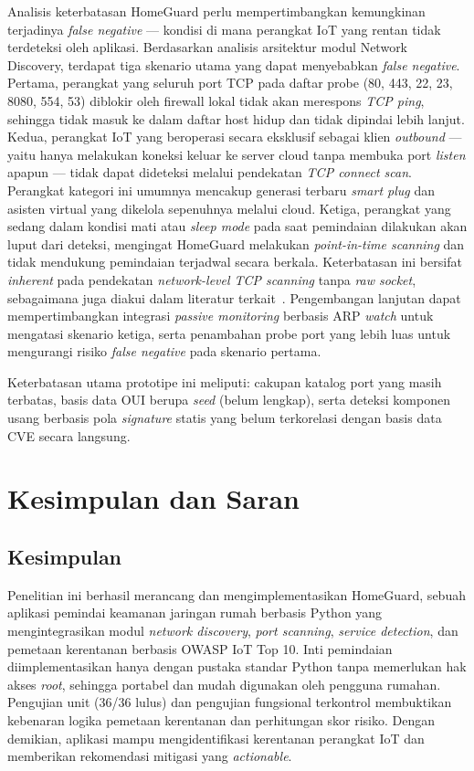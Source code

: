 Analisis keterbatasan HomeGuard perlu mempertimbangkan kemungkinan terjadinya
\textit{false negative} --- kondisi di mana perangkat IoT yang rentan tidak
terdeteksi oleh aplikasi. Berdasarkan analisis arsitektur modul Network
Discovery, terdapat tiga skenario utama yang dapat menyebabkan \textit{false
negative}. Pertama, perangkat yang seluruh port TCP pada daftar probe (80, 443,
22, 23, 8080, 554, 53) diblokir oleh firewall lokal tidak akan merespons
\textit{TCP ping}, sehingga tidak masuk ke dalam daftar host hidup dan tidak
dipindai lebih lanjut. Kedua, perangkat IoT yang beroperasi secara eksklusif
sebagai klien \textit{outbound} --- yaitu hanya melakukan koneksi keluar ke
server cloud tanpa membuka port \textit{listen} apapun --- tidak dapat
dideteksi melalui pendekatan \textit{TCP connect scan}. Perangkat kategori ini
umumnya mencakup generasi terbaru \textit{smart plug} dan asisten virtual yang
dikelola sepenuhnya melalui cloud. Ketiga, perangkat yang sedang dalam kondisi
mati atau \textit{sleep mode} pada saat pemindaian dilakukan akan luput dari
deteksi, mengingat HomeGuard melakukan \textit{point-in-time scanning} dan
tidak mendukung pemindaian terjadwal secara berkala. Keterbatasan ini bersifat
\textit{inherent} pada pendekatan \textit{network-level TCP scanning} tanpa
\textit{raw socket}, sebagaimana juga diakui dalam literatur terkait~\cite{b8}.
Pengembangan lanjutan dapat mempertimbangkan integrasi \textit{passive
monitoring} berbasis ARP \textit{watch} untuk mengatasi skenario ketiga, serta
penambahan probe port yang lebih luas untuk mengurangi risiko \textit{false
negative} pada skenario pertama.

Keterbatasan utama prototipe ini meliputi: cakupan katalog port yang masih
terbatas, basis data OUI berupa \textit{seed} (belum lengkap), serta
deteksi komponen usang berbasis pola \textit{signature} statis yang belum
terkorelasi dengan basis data CVE secara langsung.


\section{Kesimpulan dan Saran}

\subsection{Kesimpulan}
Penelitian ini berhasil merancang dan mengimplementasikan HomeGuard,
sebuah aplikasi pemindai keamanan jaringan rumah berbasis Python yang
mengintegrasikan modul \textit{network discovery}, \textit{port scanning},
\textit{service detection}, dan pemetaan kerentanan berbasis OWASP IoT
Top 10. Inti pemindaian diimplementasikan hanya dengan pustaka standar
Python tanpa memerlukan hak akses \textit{root}, sehingga portabel dan
mudah digunakan oleh pengguna rumahan. Pengujian unit (36/36 lulus) dan
pengujian fungsional terkontrol membuktikan kebenaran logika pemetaan
kerentanan dan perhitungan skor risiko. Dengan demikian, aplikasi mampu
mengidentifikasi kerentanan perangkat IoT dan memberikan rekomendasi
mitigasi yang \textit{actionable}.

